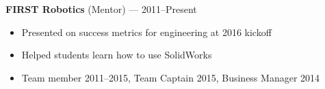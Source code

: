 \documentclass[12pt, oneside]{article}
\newcommand{\jobtitle}[2] {
	{\bf #1} {#2} \vspace{-10pt} \\
}
\begin{document}
\begin{flushleft}
\jobtitle{FIRST Robotics}{(Mentor) — 2011–Present}
\begin{itemize}
	\item Presented on success metrics for engineering at 2016 kickoff
	\item Helped students learn how to use SolidWorks
	\item Team member 2011–2015, Team Captain 2015, Business Manager 2014
\end{itemize}\vspace{-7pt}






\end{flushleft}
\end{document}
